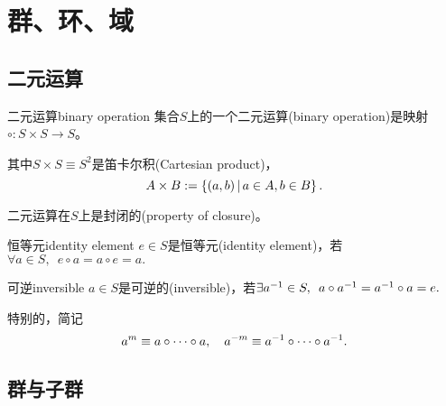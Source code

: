 \chapter{群、环、域}

\section{二元运算}

\begin{definition}{二元运算}{binary operation}
	集合$S$上的一个二元运算(binary operation)是映射$\circ:S\times S\to S$。

	其中$S\times S\equiv S^2$是笛卡尔积(Cartesian product)，
	\[
		A\times B:=\left\{(a,b)\,\middle\vert\,a\in A, b\in B\right\}.
	\]
\end{definition}
二元运算在$S$上是封闭的(property of closure)。
\begin{definition}{恒等元}{identity element}
	$e\in S$是恒等元(identity element)，若$\forall a\in S,\enspace e\circ a=a\circ e=a.$
\end{definition}
\begin{definition}{可逆}{inversible}
	$a\in S$是可逆的(inversible)，若$\exists a^{-1}\in S,\enspace a\circ a^{-1}=a^{-1}\circ a=e.$
\end{definition}
特别的，简记
\[
	a^m\equiv a\circ\cdots\circ a,\quad a^{-m}\equiv a^{-1}\circ\cdots\circ a^{-1}.
\]

\section{群与子群}


